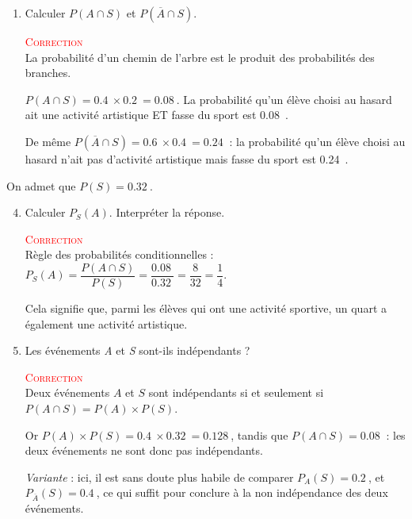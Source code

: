 \documentclass[10pt]{article}
\providecommand{\np}[2][]{{#2~#1}}
\begin{document}
\begin{enumerate}
		\item Calculer \mbox{$P(A\cap S)$} et \mbox{$P(\overline{A}\cap S)$}.



		\textcolor{red}{\textsc{Correction}}\\
		La probabilité d'un chemin de l'arbre est le produit des probabilités des branches.

		 \mbox{$P(A\cap S)=\np{0.4}\times\np{0.2}=\np{0.08}$}. La probabilité qu'un élève choisi au hasard ait une activité artistique ET fasse du sport est \np{0.08}.

		De même \mbox{$P(\overline{A}\cap S)=\np{0.6}\times\np{0.4}=\np{0.24}$} : la probabilité qu'un élève choisi au hasard n'ait pas d'activité artistique mais fasse du sport est \np{0.24}.
	\end{enumerate}
	On admet que \mbox{$P(S)=\np{0.32}$}.
\begin{enumerate}\setcounter{enumi}{3}
	\item 	Calculer \mbox{$P_S(A)$}. Interpréter la réponse.


	\textcolor{red}{\textsc{Correction}}\\
	Règle des probabilités conditionnelles : \mbox{$P_S (A)=\dfrac{P(A\cap S)}{P(S)}=\dfrac{\np{0.08}}{\np{0.32}}=\dfrac{8}{32}=\dfrac14$}.

	Cela signifie que, parmi les élèves qui ont une activité sportive, un quart a également une activité artistique.
	\item 		Les événements \textit{A} et \textit{S} sont-ils indépendants ?


\textcolor{red}{\textsc{Correction}}\\
Deux événements $A$ et $S$ sont indépendants si et seulement si \mbox{$P(A\cap S)=P(A)\times P(S)$}.

Or \mbox{$P(A)\times P(S)=\np{0.4}\times\np{0.32}=\np{0.128}$}, tandis que \mbox{$P(A\cap S)=\np{0.08}$} : les deux événements ne sont donc pas indépendants.

\textit{Variante} : ici, il est sans doute plus habile de comparer \mbox{$P_A(S)=\np{0.2}$}, et \mbox{$P_{\overline{A}}  (S)=\np{0.4}$}, ce qui suffit pour conclure à la non indépendance des deux événements.
\end{enumerate}
\end{document}
